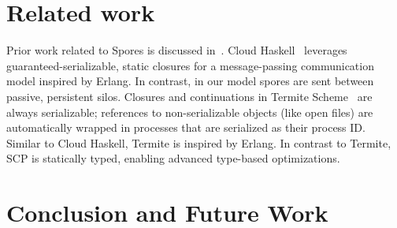 \documentclass{easychair}
\begin{document}
\section{Related work}


Prior work related to Spores is discussed in~\cite{MillerHO14}. Cloud
Haskell~\cite{CloudHaskell} leverages guaranteed-serializable, static closures
for a message-passing communication model inspired by Erlang. In contrast, in
our model spores are sent between passive, persistent silos. Closures and
continuations in Termite Scheme~\cite{Termite} are always serializable;
references to non-serializable objects (like open files) are automatically
wrapped in processes that are serialized as their process ID. Similar to Cloud
Haskell, Termite is inspired by Erlang. In contrast to Termite, SCP is statically typed,
enabling advanced type-based optimizations.



\section{Conclusion and Future Work}
\label{sec:conclusion}

%
\begin{spacing}{0.9}


\end{spacing}
\end{document}
